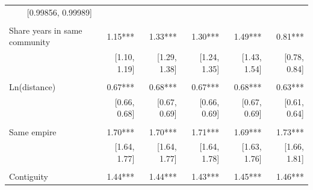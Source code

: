 \begin{table}[!h]
\begin{tabular}{llllll}
  \multicolumn{1}{r}{[0.99856, 0.99989]} \\
\multicolumn{1}{l}{} &
  \multicolumn{1}{|r}{} &
  \multicolumn{1}{r}{} &
  \multicolumn{1}{r}{} &
  \multicolumn{1}{r}{} &
  \multicolumn{1}{r}{} \\
\multicolumn{1}{l}{Share years in same community} &
  \multicolumn{1}{|r}{1.15***} &
  \multicolumn{1}{r}{1.33***} &
  \multicolumn{1}{r}{1.30***} &
  \multicolumn{1}{r}{1.49***} &
  \multicolumn{1}{r}{0.81***} \\
\multicolumn{1}{l}{} &
  \multicolumn{1}{|r}{[1.10,    1.19]} &
  \multicolumn{1}{r}{[1.29,    1.38]} &
  \multicolumn{1}{r}{[1.24,    1.35]} &
  \multicolumn{1}{r}{[1.43,    1.54]} &
  \multicolumn{1}{r}{[0.78,    0.84]} \\
\multicolumn{1}{l}{} &
  \multicolumn{1}{|r}{} &
  \multicolumn{1}{r}{} &
  \multicolumn{1}{r}{} &
  \multicolumn{1}{r}{} &
  \multicolumn{1}{r}{} \\
\multicolumn{1}{l}{Ln(distance)} &
  \multicolumn{1}{|r}{0.67***} &
  \multicolumn{1}{r}{0.68***} &
  \multicolumn{1}{r}{0.67***} &
  \multicolumn{1}{r}{0.68***} &
  \multicolumn{1}{r}{0.63***} \\
\multicolumn{1}{l}{} &
  \multicolumn{1}{|r}{[0.66,    0.68]} &
  \multicolumn{1}{r}{[0.67,    0.69]} &
  \multicolumn{1}{r}{[0.66,    0.69]} &
  \multicolumn{1}{r}{[0.67,    0.69]} &
  \multicolumn{1}{r}{[0.61,    0.64]} \\
\multicolumn{1}{l}{} &
  \multicolumn{1}{|r}{} &
  \multicolumn{1}{r}{} &
  \multicolumn{1}{r}{} &
  \multicolumn{1}{r}{} &
  \multicolumn{1}{r}{} \\
\multicolumn{1}{l}{Same empire} &
  \multicolumn{1}{|r}{1.70***} &
  \multicolumn{1}{r}{1.70***} &
  \multicolumn{1}{r}{1.71***} &
  \multicolumn{1}{r}{1.69***} &
  \multicolumn{1}{r}{1.73***} \\
\multicolumn{1}{l}{} &
  \multicolumn{1}{|r}{[1.64,    1.77]} &
  \multicolumn{1}{r}{[1.64,    1.77]} &
  \multicolumn{1}{r}{[1.64,    1.78]} &
  \multicolumn{1}{r}{[1.63,    1.76]} &
  \multicolumn{1}{r}{[1.66,    1.81]} \\
\multicolumn{1}{l}{} &
  \multicolumn{1}{|r}{} &
  \multicolumn{1}{r}{} &
  \multicolumn{1}{r}{} &
  \multicolumn{1}{r}{} &
  \multicolumn{1}{r}{} \\
\multicolumn{1}{l}{Contiguity} &
  \multicolumn{1}{|r}{1.44***} &
  \multicolumn{1}{r}{1.44***} &
  \multicolumn{1}{r}{1.43***} &
  \multicolumn{1}{r}{1.45***} &
  \multicolumn{1}{r}{1.46***} \\

\end{tabular}
\end{table}
